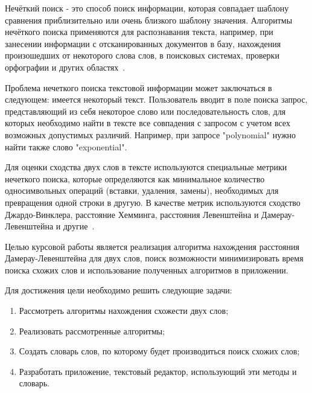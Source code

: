 \intro

Нечёткий поиск - это способ поиск информации, которая совпадает шаблону сравнения приблизительно или очень близкого шаблону значения. Алгоритмы нечёткого поиска применяются для распознавания текста, например, при занесении информации с отсканированных документов в базу, нахождения произошедших от некоторого слова слов, в поисковых системах, проверки орфографии и других областях~\cite{obzorMetodov}.

Проблема нечеткого поиска текстовой информации может заключаться в следующем: имеется некоторый текст. Пользователь вводит в поле поиска запрос, представляющий из себя некоторое слово или последовательность слов, для которых необходимо найти в тексте все совпадения с запросом с учетом всех возможных допустимых различий. Например, при запросе "polynomial" нужно найти также слово "exponential".

Для оценки сходства двух слов в тексте используются специальные метрики нечеткого поиска, которые определяются как минимальное количество односимвольных операций (вставки, удаления, замены), необходимых для превращения одной строки в другую. В качестве метрик используются сходство Джардо-Винклера, расстояние Хемминга, расстояния Левенштейна и Дамерау-Левенштейна и другие~\cite{medium}.

Целью курсовой работы является реализация алгоритма нахождения расстояния Дамерау-Левенштейна для двух слов, поиск возможности минимизировать время поиска схожих слов и использование полученных алгоритмов в приложении.

Для достижения цели необходимо решить следующие задачи:

\begin{enumerate}
  \item Рассмотреть алгоритмы нахождения схожести двух слов;
  \item Реализовать рассмотренные алгоритмы;
  \item Создать словарь слов, по которому будет производиться поиск схожих слов;
  \item Разработать приложение, текстовый редактор, использующий эти методы и словарь.
\end{enumerate}